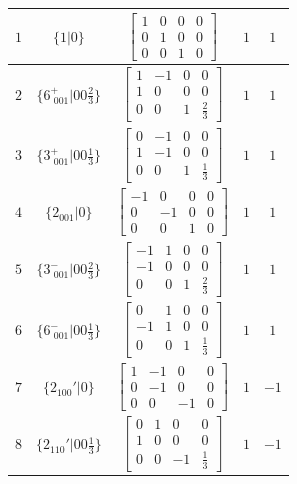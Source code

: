 \documentclass[fleqn,8pt]{jsarticle}
\begin{document}
\begin{longtable}{ccccc}
$ 1 $ & $ \{1|0\} $ & $ \begin{bmatrix} 1 & 0 & 0 & 0 \\ 0 & 1 & 0 & 0 \\ 0 & 0 & 1 & 0 \end{bmatrix} $ & $ 1 $ & $ 1 $ \\ \hline
$ 2 $ & $ \{6^{+}_{\,\,001}|0 0 \frac{2}{3}\} $ & $ \begin{bmatrix} 1 & -1 & 0 & 0 \\ 1 & 0 & 0 & 0 \\ 0 & 0 & 1 & \frac{2}{3} \end{bmatrix} $ & $ 1 $ & $ 1 $ \\ \hline
$ 3 $ & $ \{3^{+}_{\,\,001}|0 0 \frac{1}{3}\} $ & $ \begin{bmatrix} 0 & -1 & 0 & 0 \\ 1 & -1 & 0 & 0 \\ 0 & 0 & 1 & \frac{1}{3} \end{bmatrix} $ & $ 1 $ & $ 1 $ \\ \hline
$ 4 $ & $ \{2{}_{001}|0\} $ & $ \begin{bmatrix} -1 & 0 & 0 & 0 \\ 0 & -1 & 0 & 0 \\ 0 & 0 & 1 & 0 \end{bmatrix} $ & $ 1 $ & $ 1 $ \\ \hline
$ 5 $ & $ \{3^{-}_{\,\,001}|0 0 \frac{2}{3}\} $ & $ \begin{bmatrix} -1 & 1 & 0 & 0 \\ -1 & 0 & 0 & 0 \\ 0 & 0 & 1 & \frac{2}{3} \end{bmatrix} $ & $ 1 $ & $ 1 $ \\ \hline
$ 6 $ & $ \{6^{-}_{\,\,001}|0 0 \frac{1}{3}\} $ & $ \begin{bmatrix} 0 & 1 & 0 & 0 \\ -1 & 1 & 0 & 0 \\ 0 & 0 & 1 & \frac{1}{3} \end{bmatrix} $ & $ 1 $ & $ 1 $ \\ \hline
$ 7 $ & $ \{2{}_{100}{}'|0\} $ & $ \begin{bmatrix} 1 & -1 & 0 & 0 \\ 0 & -1 & 0 & 0 \\ 0 & 0 & -1 & 0 \end{bmatrix} $ & $ 1 $ & $ -1 $ \\ \hline
$ 8 $ & $ \{2{}_{110}{}'|0 0 \frac{1}{3}\} $ & $ \begin{bmatrix} 0 & 1 & 0 & 0 \\ 1 & 0 & 0 & 0 \\ 0 & 0 & -1 & \frac{1}{3} \end{bmatrix} $ & $ 1 $ & $ -1 $ \\ \hline

\end{longtable}
\end{document}
